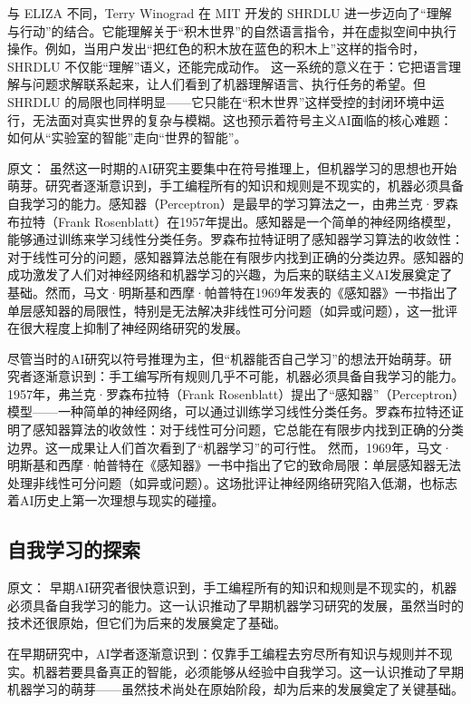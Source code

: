 与 ELIZA 不同，Terry Winograd 在 MIT 开发的 SHRDLU 进一步迈向了“理解与行动”的结合。它能理解关于“积木世界”的自然语言指令，并在虚拟空间中执行操作。例如，当用户发出“把红色的积木放在蓝色的积木上”这样的指令时，SHRDLU 不仅能“理解”语义，还能完成动作。  
这一系统的意义在于：它把语言理解与问题求解联系起来，让人们看到了机器理解语言、执行任务的希望。但 SHRDLU 的局限也同样明显——它只能在“积木世界”这样受控的封闭环境中运行，无法面对真实世界的复杂与模糊。这也预示着符号主义AI面临的核心难题：如何从“实验室的智能”走向“世界的智能”。

原文：
虽然这一时期的AI研究主要集中在符号推理上，但机器学习的思想也开始萌芽。研究者逐渐意识到，手工编程所有的知识和规则是不现实的，机器必须具备自我学习的能力。感知器（Perceptron）是最早的学习算法之一，由弗兰克·罗森布拉特（Frank Rosenblatt）在1957年提出。感知器是一个简单的神经网络模型，能够通过训练来学习线性分类任务。罗森布拉特证明了感知器学习算法的收敛性：对于线性可分的问题，感知器算法总能在有限步内找到正确的分类边界。感知器的成功激发了人们对神经网络和机器学习的兴趣，为后来的联结主义AI发展奠定了基础。然而，马文·明斯基和西摩·帕普特在1969年发表的《感知器》一书指出了单层感知器的局限性，特别是无法解决非线性可分问题（如异或问题），这一批评在很大程度上抑制了神经网络研究的发展。\

尽管当时的AI研究以符号推理为主，但“机器能否自己学习”的想法开始萌芽。研究者逐渐意识到：手工编写所有规则几乎不可能，机器必须具备自我学习的能力。  
1957年，弗兰克·罗森布拉特（Frank Rosenblatt）提出了“感知器”（Perceptron）模型——一种简单的神经网络，可以通过训练学习线性分类任务。罗森布拉特还证明了感知器算法的收敛性：对于线性可分问题，它总能在有限步内找到正确的分类边界。这一成果让人们首次看到了“机器学习”的可行性。  
然而，1969年，马文·明斯基和西摩·帕普特在《感知器》一书中指出了它的致命局限：单层感知器无法处理非线性可分问题（如异或问题）。这场批评让神经网络研究陷入低潮，也标志着AI历史上第一次理想与现实的碰撞。

\subsection{自我学习的探索}

原文：
早期AI研究者很快意识到，手工编程所有的知识和规则是不现实的，机器必须具备自我学习的能力。这一认识推动了早期机器学习研究的发展，虽然当时的技术还很原始，但它们为后来的发展奠定了基础。

在早期研究中，AI学者逐渐意识到：仅靠手工编程去穷尽所有知识与规则并不现实。机器若要具备真正的智能，必须能够从经验中自我学习。这一认识推动了早期机器学习的萌芽——虽然技术尚处在原始阶段，却为后来的发展奠定了关键基础。

